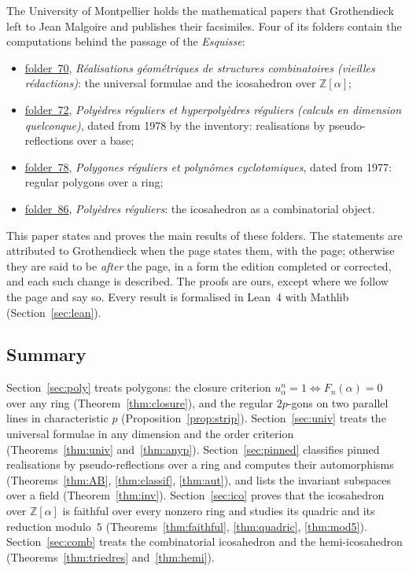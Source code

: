 \documentclass[11pt,a4paper]{amsart}
\theoremstyle{definition}
\theoremstyle{remark}
\newcommand{\Z}{\mathbb Z}
\newcommand{\fac}[1]{\href{https://grothendieck.umontpellier.fr/#1.pdf}{folder~#1}}
\begin{document}
The University of Montpellier holds the mathematical papers that Grothendieck left to Jean Malgoire and publishes their facsimiles. Four of its folders contain the computations behind the passage of the \emph{Esquisse}:
\begin{itemize}[leftmargin=1.5em]
\item \fac{70}, \emph{Réalisations géométriques de structures combinatoires (vieilles rédactions)}: the universal formulae and the icosahedron over $\Z[\alpha]$;
\item \fac{72}, \emph{Polyèdres réguliers et hyperpolyèdres réguliers (calculs en dimension quelconque)}, dated from 1978 by the inventory: realisations by pseudo-reflections over a base;
\item \fac{78}, \emph{Polygones réguliers et polynômes cyclotomiques}, dated from 1977: regular polygons over a ring;
\item \fac{86}, \emph{Polyèdres réguliers}: the icosahedron as a combinatorial object.
\end{itemize}
This paper states and proves the main results of these folders. The statements are attributed to Grothendieck when the page states them, with the page; otherwise they are said to be \emph{after} the page, in a form the edition completed or corrected, and each such change is described. The proofs are ours, except where we follow the page and say so. Every result is formalised in Lean~4 with Mathlib (Section~\ref{sec:lean}).

\subsection*{Summary}
Section~\ref{sec:poly} treats polygons: the closure criterion $u_\alpha^n = 1 \iff F_n(\alpha) = 0$ over any ring (Theorem~\ref{thm:closure}), and the regular $2p$-gons on two parallel lines in characteristic $p$ (Proposition~\ref{prop:strip}). Section~\ref{sec:univ} treats the universal formulae in any dimension and the order criterion (Theorems~\ref{thm:univ} and~\ref{thm:anyp}). Section~\ref{sec:pinned} classifies pinned realisations by pseudo-reflections over a ring and computes their automorphisms (Theorems~\ref{thm:AB}, \ref{thm:classif}, \ref{thm:aut}), and lists the invariant subspaces over a field (Theorem~\ref{thm:inv}). Section~\ref{sec:ico} proves that the icosahedron over $\Z[\alpha]$ is faithful over every nonzero ring and studies its quadric and its reduction modulo~$5$ (Theorems~\ref{thm:faithful}, \ref{thm:quadric}, \ref{thm:mod5}). Section~\ref{sec:comb} treats the combinatorial icosahedron and the hemi-icosahedron (Theorems~\ref{thm:triedres} and~\ref{thm:hemi}).
\end{document}

